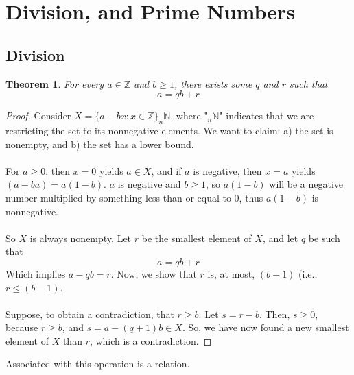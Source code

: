 \documentclass[10pt]{article}
\newcommand\ZZ{{\mathbb Z}}
\newcommand\NN{{\mathbb N}}
\newtheorem{theorem}{Theorem}[section]
\theoremstyle{definition}
\begin{document}
\pagestyle{fancy}

\setlength{\headheight}{0pt}
\setlength\parindent{0pt}

\def\abs#1{\vert #1 \vert}
\def\set#1{\{ #1 \}}

\let\oldref\ref
\renewcommand{\ref}[1]{(\oldref{#1})}

\setlength{\headheight}{0pt}
\tableofcontents
\newpage
\section{Division, and Prime Numbers}
\subsection{Division} 
\begin{theorem}
For every $a\in \ZZ$ and $b \geq 1$, there exists some $q$ and $r$ such that 
\[ a = qb+r
\]
\end{theorem}
\begin{proof}
Consider $X = \set{a-bx:x\in\ZZ}_n\NN$, where "$_n\NN$" indicates that we are restricting the set to its nonnegative elements.  We want to claim: a) the set is nonempty, and b) the set has a lower bound.  \\~\\ 
For $a\geq 0$, then $x=0$ yields $a\in X$, and if $a$ is negative, then $x=a$ yields $(a-ba) = a(1-b)$.  $a$ is negative and $b\geq 1$, so $a(1-b)$ will be a negative number multiplied by something less than or equal to $0$, thus $a(1-b)$ is nonnegative.  \\~\\
So $X$ is always nonempty.  Let $r$ be the smallest element of $X$, and let $q$ be such that 
\[ a = qb+r
\]
Which implies $a - qb = r$.  Now, we show that $r$ is, at most, $(b-1)$ (i.e., $r\leq (b-1)$.  \\~\\
Suppose, to obtain a contradiction, that $r\geq b$.  Let $s=r-b$.  Then, $s\geq 0$, because $r\geq b$, and $s = a-(q+1)b \in X$.  So, we have now found a new smallest element of $X$ than $r$, which is a contradiction. 
\end{proof}
Associated with this operation is a relation. 
\end{document}
